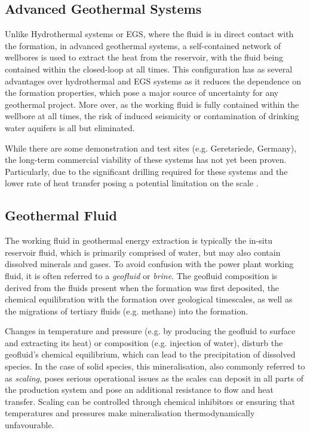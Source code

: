     \subsection{Advanced Geothermal Systems}
    \label{sec:stimulation}

    Unlike Hydrothermal systems or EGS, where the fluid is in direct contact with the formation, in advanced geothermal systems, a self-contained network of wellbores is used to extract the heat from the reservoir, with the fluid being contained within the closed-loop at all times. This configuration has as several advantages over hydrothermal and EGS systems as it reduces the dependence on the formation properties, which pose a major source of uncertainty for any geothermal project. More over, as the working fluid is fully contained within the wellbore at all times, the risk of induced seismicity or contamination of drinking water aquifers is all but eliminated. %
    
    While there are some demonstration and test sites (e.g. Geretsriede, Germany), the long-term commercial viability of these systems has not yet been proven. Particularly, due to the significant drilling required for these systems and the lower rate of heat transfer posing a potential limitation on the scale \cite{Malek2022, Beckers2022}.

    \subsection{Geothermal Fluid}
    \label{sec:geothermal_fluid}
        The working fluid in geothermal energy extraction is typically the in-situ reservoir fluid, which is primarily comprised of water, but may also contain dissolved minerals and gases. To avoid confusion with the power plant working fluid, it is often referred to a \emph{geofluid} or \emph{brine}. The geofluid composition is derived from the fluids present when the formation was first deposited, the chemical equilibration with the formation over geological timescales, as well as the migrations of tertiary fluids (e.g. methane) into the formation.

        Changes in temperature and pressure (e.g. by producing the geofluid to surface and extracting its heat) or composition (e.g. injection of water), disturb the geofluid's chemical equilibrium, which can lead to the precipitation of dissolved species. In the case of solid species, this mineralisation, also commonly referred to as \emph{scaling}, poses serious operational issues as the scales can deposit in all parts of the production system and pose an additional resistance to flow and heat transfer. Scaling can be controlled through chemical inhibitors or ensuring that temperatures and pressures make mineralisation thermodynamically unfavourable.

